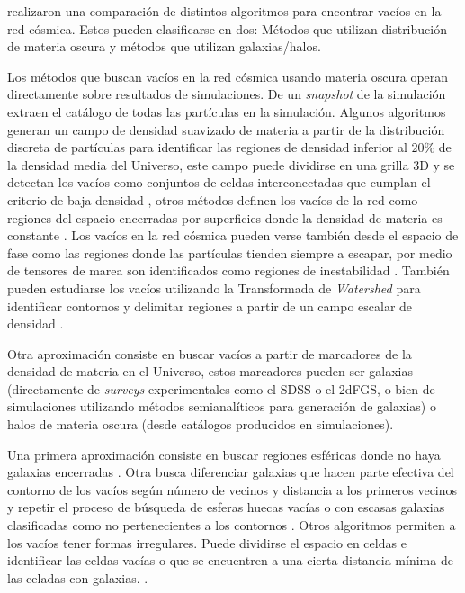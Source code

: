 \documentclass[preprint]{aastex62}
\begin{document}
  
  \citet{Aspen-Amsterdam2008} realizaron una comparación de distintos algoritmos para encontrar vacíos
  en la red cósmica. Estos pueden clasificarse en dos: Métodos que utilizan distribución de materia
  oscura y métodos que utilizan galaxias/halos.

  Los métodos que buscan vacíos en la red cósmica usando materia oscura operan directamente sobre
  resultados de simulaciones. De un \textit{snapshot} de la simulación extraen el catálogo de todas
  las partículas en la simulación. Algunos algoritmos generan un campo de densidad suavizado de
  materia a partir de la distribución discreta de partículas para identificar las regiones de
  densidad inferior al $20\%$ de la densidad media del Universo\citep{Ref_Aspen-Amsterdam2008},
  este campo puede dividirse en una grilla 3D y se detectan los vacíos como conjuntos de celdas
  interconectadas que cumplan el criterio de baja densidad \citep{Ref_Aspen-Amsterdam2008},
  otros métodos definen los vacíos de la red como regiones del espacio encerradas por superficies
  donde la densidad de materia es constante \citep{Ref_Aspen-Amsterdam2008}.
  Los vacíos en la red cósmica pueden verse también desde el espacio de fase como las regiones
  donde las partículas tienden siempre a escapar, por medio de tensores de marea son identificados
  como regiones de inestabilidad \citep{Ref_Aspen-Amsterdam2008}.
  También pueden estudiarse los vacíos utilizando la Transformada de \textit{Watershed} para
  identificar contornos y delimitar regiones a partir de un campo escalar de densidad
  \citep{Ref_Aspen-Amsterdam2008}.

  Otra aproximación consiste en buscar vacíos a partir de marcadores de la densidad de materia
  en el Universo, estos marcadores pueden ser galaxias (directamente de \textit{surveys} experimentales como el
  SDSS o el 2dFGS, o bien de simulaciones utilizando métodos semianalíticos para generación de
  galaxias) o halos de materia oscura (desde catálogos producidos en simulaciones).

  Una primera aproximación consiste en buscar regiones esféricas donde no haya galaxias encerradas
  \citep{Ref_Aspen-Amsterdam2008}. Otra busca diferenciar galaxias que hacen parte efectiva del contorno
  de los vacíos según número de vecinos y distancia a los primeros vecinos y repetir el proceso de
  búsqueda de esferas huecas vacías o con escasas galaxias clasificadas como no pertenecientes a
  los contornos \citep{Ref_Aspen-Amsterdam2008}. Otros algoritmos permiten a los vacíos tener
  formas irregulares. Puede dividirse el espacio en celdas e identificar las celdas vacías o que
  se encuentren a una cierta distancia mínima de las celadas con galaxias. \citep{Ref_Aspen-Amsterdam2008}.
\end{document}
